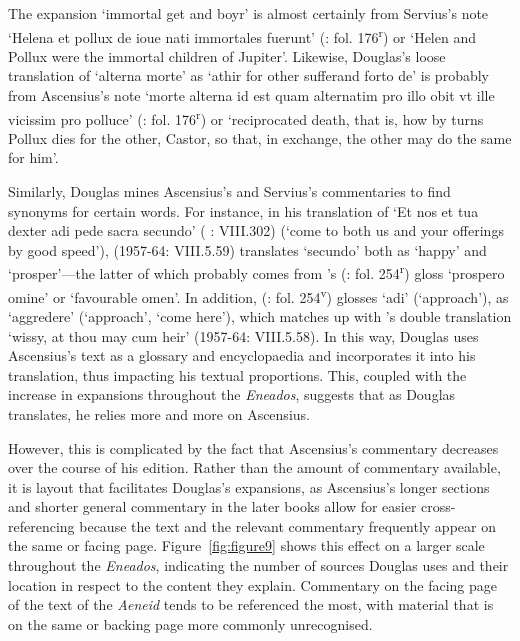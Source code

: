 \documentclass{dhbenelux}
\begin{document}
The expansion `immortal get and boyr' is almost certainly from Servius's
note `Helena et pollux de ioue nati immortales fuerunt' (\citeyear{servius1501}:
fol. 176\textsuperscript{r}) or `Helen and Pollux were the immortal children
of Jupiter'. Likewise, Douglas's loose translation of `alterna morte' as
`athir for other sufferand forto de' is probably from Ascensius's note
`morte alterna id est quam alternatim pro illo obit vt ille vicissim pro
polluce' (\citeyear{ascensius1501}: fol. 176\textsuperscript{r}) or `reciprocated death, that is, how
by turns Pollux dies for the other, Castor, so that, in exchange, the
other may do the same for him'.

Similarly, Douglas mines Ascensius's and Servius's commentaries to find
synonyms for certain words. For instance, in his translation of `Et nos
et tua dexter adi pede sacra secundo' (\citeauthor{virgil1501} \citeyear{virgil1501}: VIII.302) (`come to
both us and your offerings by good speed'), \citeauthor{douglas1957} (1957-64: VIII.5.59)
translates `secundo' both as `happy' and `prosper'---the latter of which
probably comes from \citeauthor{servius1501}'s (\citeyear{servius1501}: fol. 254\textsuperscript{r}) gloss
`prospero omine' or `favourable omen'. In addition, \citeauthor{ascensius1501} (\citeyear{ascensius1501}:
fol. 254\textsuperscript{v}) glosses `adi' (`approach'), as `aggredere'
(`approach', `come here'), which matches up with \citeauthor{douglas1957}'s double
translation `wissy, at thou may cum heir' (1957-64: VIII.5.58). In this
way, Douglas uses Ascensius's text as a glossary and encyclopaedia and
incorporates it into his translation, thus impacting his textual
proportions. This, coupled with the increase in expansions throughout
the \emph{Eneados}, suggests that as Douglas translates, he relies more
and more on Ascensius.

However, this is complicated by the fact that Ascensius's commentary
decreases over the course of his edition. Rather than the amount of
commentary available, it is layout that facilitates Douglas's
expansions, as Ascensius's longer sections and shorter general
commentary in the later books allow for easier cross-referencing because
the text and the relevant commentary frequently appear on the same or
facing page. Figure~\ref{fig:figure9} shows this effect on a larger scale throughout the
\emph{Eneados}, indicating the number of sources Douglas uses and their
location in respect to the content they explain. Commentary on the
facing page of the text of the \emph{Aeneid} tends to be referenced the
most, with material that is on the same or backing page more commonly
unrecognised.
\end{document}

